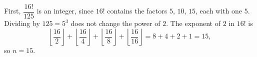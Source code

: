 First, $\dfrac{16!}{125}$ is an integer, since $16!$ contains the factors $5$, $10$, $15$, each with one $5$. Dividing by $125=5^3$ does not change the power of $2$. The exponent of $2$ in $16!$ is
\[\left\lfloor\dfrac{16}{2}\right\rfloor+\left\lfloor\dfrac{16}{4}\right\rfloor+\left\lfloor\dfrac{16}{8}\right\rfloor+\left\lfloor\dfrac{16}{16}\right\rfloor=8+4+2+1=15,\]
so $n=\boxed{15}$.
